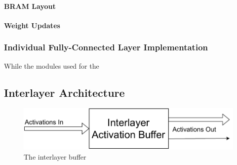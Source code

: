 \paragraph{BRAM Layout}

\paragraph{Weight Updates}

\subsubsection{Individual Fully-Connected Layer Implementation}
While the modules used for the 


\subsection{Interlayer Architecture}
\begin{figure}
	\centering 
	\includegraphics[width=\textwidth]{figures/interlayer_buffer}
	\caption{The interlayer buffer}\label{softmax-arch}
\end{figure}

